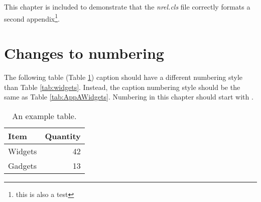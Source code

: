 This chapter is included to demonstrate that the \emph{nrel.cls} file correctly formats a second appendix\footnote{this is also a test}.

\section{Changes to numbering}
The following table (Table \ref{tab:AppBWidgets}) caption should have a different numbering style than Table \ref{tab:widgets}. Instead, the caption numbering style should be the same as Table \ref{tab:AppAWidgets}. Numbering in this chapter should start with \thechapter.

\begin{table}[!h]
\centering
\caption{An example table.}\label{tab:AppBWidgets}
\begin{tabular}{lr}
Item & Quantity \\
\hline
Widgets & 42 \\
Gadgets & 13
\end{tabular}
\end{table}
